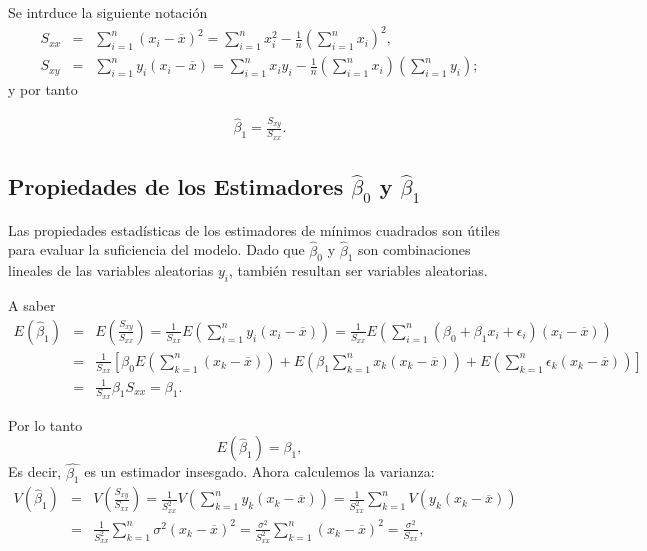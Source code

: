 \documentclass[a4paper]{report} %
\begin{document}
Se intrduce la siguiente notaci\'on
\begin{eqnarray}
S_{xx}&=&\sum_{i=1}^{n}\left(x_{i}-\overline{x}\right)^{2}=\sum_{i=1}^{n}x_{i}^{2}-\frac{1}{n}\left(\sum_{i=1}^{n}x_{i}\right)^{2},\\
S_{xy}&=&\sum_{i=1}^{n}y_{i}\left(x_{i}-\overline{x}\right)=\sum_{i=1}^{n}x_{i}y_{i}-\frac{1}{n}\left(\sum_{i=1}^{n}x_{i}\right)\left(\sum_{i=1}^{n}y_{i}\right);
\end{eqnarray}
y por tanto

\begin{eqnarray}
\hat{\beta}_{1}=\frac{S_{xy}}{S_{xx}}.
\end{eqnarray}
\subsection{Propiedades de los Estimadores $\hat{\beta}_{0}$ y $\hat{\beta}_{1}$}

Las propiedades estad\'isticas de los estimadores de m\'inimos cuadrados son \'utiles para evaluar la suficiencia del modelo. Dado que $\hat{\beta}_{0}$ y  $\hat{\beta}_{1}$ son combinaciones lineales de las variables aleatorias $y_{i}$, tambi\'en resultan ser variables aleatorias.

A saber
\begin{eqnarray*}
E\left(\hat{\beta}_{1}\right)&=&E\left(\frac{S_{xy}}{S_{xx}}\right)=\frac{1}{S_{xx}}E\left(\sum_{i=1}^{n}y_{i}\left(x_{i}-\overline{x}\right)\right)=\frac{1}{S_{xx}}E\left(\sum_{i=1}^{n}\left(\beta_{0}+\beta_{1}x_{i}+\epsilon_{i}\right)\left(x_{i}-\overline{x}\right)\right)\\
&=&\frac{1}{S_{xx}}\left[\beta_{0}E\left(\sum_{k=1}^{n}\left(x_{k}-\overline{x}\right)\right)+E\left(\beta_{1}\sum_{k=1}^{n}x_{k}\left(x_{k}-\overline{x}\right)\right)+E\left(\sum_{k=1}^{n}\epsilon_{k}\left(x_{k}-\overline{x}\right)\right)\right]\\
&=&\frac{1}{S_{xx}}\beta_{1}S_{xx}=\beta_{1}.
\end{eqnarray*}

Por lo tanto 
\begin{equation}\label{Esperanza.Beta.1.Original}
E\left(\hat{\beta}_{1}\right)=\beta_{1},
\end{equation}
Es decir, $\hat{\beta_{1}}$ es un estimador insesgado. Ahora calculemos la varianza:
\begin{eqnarray*}
V\left(\hat{\beta}_{1}\right)&=&V\left(\frac{S_{xy}}{S_{xx}}\right)=\frac{1}{S_{xx}^{2}}V\left(\sum_{k=1}^{n}y_{k}\left(x_{k}-\overline{x}\right)\right)=\frac{1}{S_{xx}^{2}}\sum_{k=1}^{n}V\left(y_{k}\left(x_{k}-\overline{x}\right)\right)\\
&=&\frac{1}{S_{xx}^{2}}\sum_{k=1}^{n}\sigma^{2}\left(x_{k}-\overline{x}\right)^{2}=\frac{\sigma^{2}}{S_{xx}^{2}}\sum_{k=1}^{n}\left(x_{k}-\overline{x}\right)^{2}=\frac{\sigma^{2}}{S_{xx}},
\end{eqnarray*}
\end{document}
